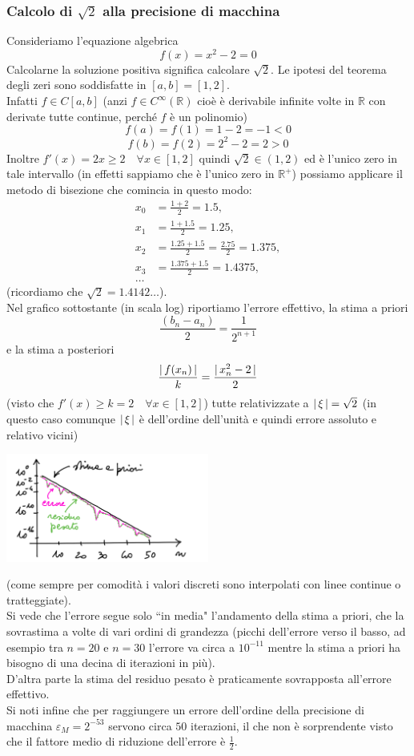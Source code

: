 \documentclass[12pt]{article}
\DeclarePairedDelimiter{\abs}{\lvert}{\rvert}
\begin{document}
\subsubsection{Calcolo di $\sqrt{2}$ alla precisione di macchina}
Consideriamo l'equazione algebrica
\[f(x)=x^2-2=0\] Calcolarne la soluzione positiva significa calcolare $\sqrt{2}$. Le ipotesi del teorema degli zeri sono soddisfatte in $[a,b]=[1,2]$.\\
Infatti $f\in C[a,b]$ (anzi $f\in C^{\infty}(\mathbb{R})$ cioè è derivabile infinite volte in $\mathbb{R}$ con derivate tutte continue, perché $f$ è un polinomio) \[f(a)=f(1)=1-2=-1<0\] \[f(b)=f(2)=2^2-2=2>0\]
Inoltre $f'(x)=2x \geq 2\quad\forall x \in [1,2]$ quindi $\sqrt{2}\in (1,2)$ ed è l'unico zero in tale intervallo (in effetti sappiamo che è l'unico zero in $\mathbb{R}^+$)
possiamo applicare il metodo di bisezione che comincia in questo modo: 
\[\begin{split}
    x_0 & = \frac{1+2}{2} = 1.5, \\
    x_1 & = \frac{1+1.5}{2} = 1.25, \\
    x_2 & = \frac{1.25+1.5}{2} = \frac{2.75}{2} = 1.375, \\
    x_3 & = \frac{1.375+1.5}{2} = 1.4375, \\
    \dotso
\end{split}\]
(ricordiamo che $\sqrt{2}=1.4142\dots$).\\
Nel grafico sottostante (in scala log) riportiamo l'errore effettivo, la stima a priori \[\frac{(b_n-a_n)}{2}=\frac{1}{2^{n+1}}\] 
e la stima a posteriori
\[\frac{\abs{\,f(x_n)\,}}{k}=\frac{\abs{\,x_n^2-2\,}}{2}\]
(visto che $f'(x)\ge k=2 \quad \forall x\in [1,2]$) tutte relativizzate a $\abs{\,\xi\,}=\sqrt{2}$ (in questo caso comunque $\abs{\,\xi\,}$ è dell'ordine dell'unità e quindi errore assoluto e relativo vicini)
\begin{center}
    \includegraphics[width=0.5\textwidth]{grafo2.png}\par
\end{center}
(come sempre per comodità i valori discreti sono interpolati con linee continue o tratteggiate).\\
Si vede che l'errore segue solo ``in media" l'andamento della stima a priori, che la sovrastima a volte di vari ordini di grandezza (picchi dell'errore verso il basso, ad esempio tra $n=20$ e $n=30$ l'errore va circa a $10^{-11}$ mentre la stima a priori ha bisogno di una decina di iterazioni in più).\\
D'altra parte la stima del residuo pesato è praticamente sovrapposta all'errore effettivo.\\
Si noti infine che per raggiungere un errore dell'ordine della precisione di macchina $\varepsilon_M=2^{-53}$ servono circa $50$ iterazioni, il che non è sorprendente visto che il fattore medio di riduzione dell'errore è $\frac{1}{2}$.
\end{document}
